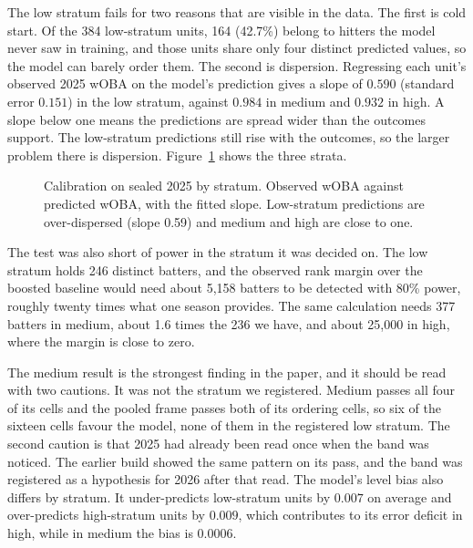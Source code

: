 \documentclass[11pt,letterpaper]{article}
\begin{document}
The low stratum fails for two reasons that are visible in the data. The first is cold start. Of the 384 low-stratum units, 164 (42.7\%) belong to hitters the model never saw in training, and those units share only four distinct predicted values, so the model can barely order them. The second is dispersion. Regressing each unit's observed 2025 wOBA on the model's prediction gives a slope of $0.590$ (standard error $0.151$) in the low stratum, against $0.984$ in medium and $0.932$ in high. A slope below one means the predictions are spread wider than the outcomes support. The low-stratum predictions still rise with the outcomes, so the larger problem there is dispersion. Figure~\ref{fig:cal2025} shows the three strata.

\begin{figure}[t]
\centering
{}
\caption{Calibration on sealed 2025 by stratum. Observed wOBA against predicted wOBA, with the fitted slope. Low-stratum predictions are over-dispersed (slope 0.59) and medium and high are close to one.}
\label{fig:cal2025}
\end{figure}

The test was also short of power in the stratum it was decided on. The low stratum holds 246 distinct batters, and the observed rank margin over the boosted baseline would need about 5,158 batters to be detected with 80\% power, roughly twenty times what one season provides. The same calculation needs 377 batters in medium, about 1.6 times the 236 we have, and about 25,000 in high, where the margin is close to zero.

The medium result is the strongest finding in the paper, and it should be read with two cautions. It was not the stratum we registered. Medium passes all four of its cells and the pooled frame passes both of its ordering cells, so six of the sixteen cells favour the model, none of them in the registered low stratum. The second caution is that 2025 had already been read once when the band was noticed. The earlier build showed the same pattern on its pass, and the band was registered as a hypothesis for 2026 after that read. The model's level bias also differs by stratum. It under-predicts low-stratum units by $0.007$ on average and over-predicts high-stratum units by $0.009$, which contributes to its error deficit in high, while in medium the bias is $0.0006$.
\end{document}

